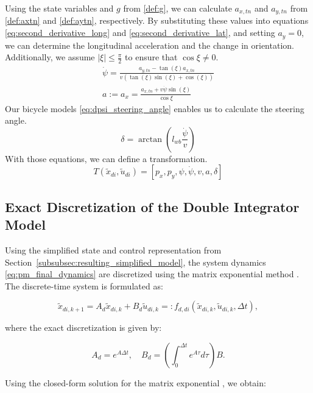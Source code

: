 Using the state variables and $g$ from \eqref{def:g}, we can calculate $a_{x,tn}$ and $a_{y,tn}$ from \eqref{def:axtn} and \eqref{def:aytn},
respectively.
By substituting these values into equations \eqref{eq:second_derivative_long} and \eqref{eq:second_derivative_lat}, and setting $a_y = 0$, we can
determine the longitudinal acceleration and the change in orientation.
Additionally, we assume $|\xi| \leq \frac{\pi}{2}$ to ensure that $\cos{\xi} \neq 0$.
\begin{align}
	\dot{\psi} = \frac{a_{y,tn} - \tan(\xi) a_{x,tn}}{v (\tan(\xi) \sin(\xi) + \cos(\xi))} \\
	a := a_x = \frac{a_{x,tn} + v \dot{\psi} \sin(\xi)}{\cos{\xi}}
\end{align}
Our bicycle models \eqref{eq:dpsi_steering_angle} enables us to calculate the steering angle.
\begin{equation}
	\delta = \arctan(l_{wb}\frac{\dot{\psi}}{v})
\end{equation}
With those equations, we can define a transformation.
\begin{equation}
	T(\tilde{x}_{di}, \tilde{u}_{di}) = [p_x, p_y, \psi, \dot{\psi}, v, a, \delta] \label{eq:pm_state_transformation} \end{equation}

\subsection{Exact Discretization of the Double Integrator Model}

Using the simplified state and control representation from
Section~\ref{subsubsec:resulting_simplified_model}, the system dynamics \eqref{eq:pm_final_dynamics} are discretized using the matrix exponential
method \cite{kailath_linear_1980, ogata_modern_2010}.
The discrete-time system is formulated as:

\begin{equation}
	\label{eq:discrete_time_dynamics_di}
	\tilde{x}_{di, k+1} = A_d \tilde{x}_{di, k} + B_d \tilde{u}_{di, k} =: f_{d, di}(\tilde{x}_{di, k}, \tilde{u}_{di, k}, \Delta t),
\end{equation}

where the exact discretization is given by:

\begin{equation}
	A_d = e^{A \Delta t}, \quad B_d = \left( \int_0^{\Delta t} e^{A \tau} d\tau \right) B.
\end{equation}

Using the closed-form solution for the matrix exponential \cite{noauthor_matrix_nodate}, we obtain:

